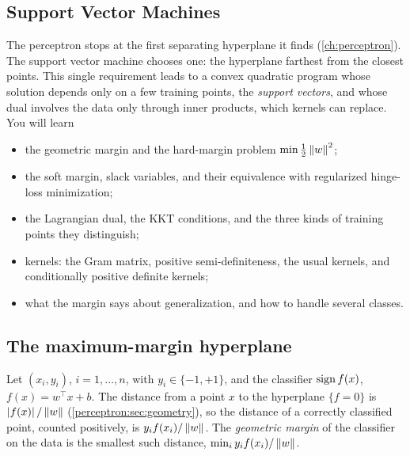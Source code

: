 \begin{notechapter}
\chapter{Support Vector Machines}\label{ch:svm}

\begin{chapterintro}
The perceptron stops at the first separating hyperplane it finds
(\cref{ch:perceptron}). The support vector machine chooses one: the hyperplane
farthest from the closest points. This single requirement leads to a convex
quadratic program whose solution depends only on a few training points, the
\emph{support vectors}, and whose dual involves the data only through inner
products, which kernels can replace. You will learn
\begin{itemize}[nosep]
  \item the geometric margin and the hard-margin problem $\min\frac12\left\|w\right\|^2$;
  \item the soft margin, slack variables, and their equivalence with regularized
        hinge-loss minimization;
  \item the Lagrangian dual, the KKT conditions, and the three kinds of training
        points they distinguish;
  \item kernels: the Gram matrix, positive semi-definiteness, the usual kernels, and
        conditionally positive definite kernels;
  \item what the margin says about generalization, and how to handle several
        classes.
\end{itemize}
\end{chapterintro}

\section{The maximum-margin hyperplane}\label{svm:sec:hard}

Let $(x_i, y_i)$, $i = 1,\dots,n$, with $y_i\in\{-1, +1\}$, and the classifier $\operatorname{sign} f(x)$, $f(x) = w^\top x + b$. The
distance from a point $x$ to the hyperplane $\{f = 0\}$ is $\left|f(x)\right|/\left\|w\right\|$
(\cref{perceptron:sec:geometry}), so the distance of a correctly classified point,
counted positively, is $y_if(x_i)/\left\|w\right\|$. The \emph{geometric margin} of the classifier on the
data is the smallest such distance, $\min_iy_if(x_i)/\left\|w\right\|$.


\end{notechapter}
